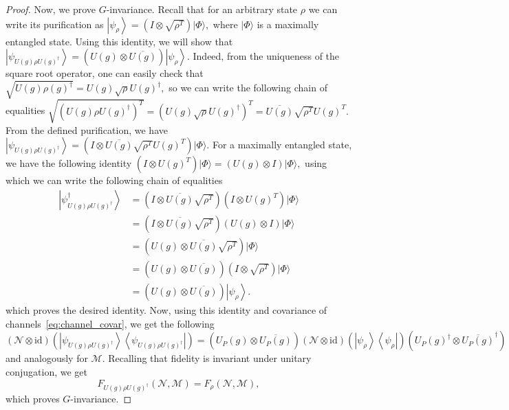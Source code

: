 \documentclass[11pt,letterpaper]{article}
\theoremstyle{plain}
\theoremstyle{plain}
\theoremstyle{plain}
\theoremstyle{plain}
\theoremstyle{plain}
\theoremstyle{plain}
\theoremstyle{plain}
\theoremstyle{definition}
\theoremstyle{plain}
\begin{document}
\begin{proof}
    Now, we prove $G$-invariance. Recall that for an arbitrary state $\rho$ we can write its purification as
    $
        \left|\psi_\rho\right\rangle=\left(I \otimes \sqrt{\rho^T}\right)|\Phi\rangle,
    $
    where $|\Phi\rangle$ is a maximally entangled state. Using this identity, we will show that
    $
        \left|\psi_{U(g) \rho U(g)^{\dagger}}\right\rangle=\left(U(g) \otimes \overline{U(g)}\right)\left|\psi_\rho\right\rangle.
    $
    Indeed, from the uniqueness of the square root operator, one can easily check that
    $
        \sqrt{U(g) \rho (g)^{\dagger}}=U(g) \sqrt{\rho} U(g)^{\dagger},
    $
    so we can write the following chain of equalities
    $
        \sqrt{\left(U(g) \rho U(g)^{\dagger}\right)^T}=\left(U(g) \sqrt{\rho} U(g)^{\dagger}\right)^T=\overline{U(g)} \sqrt{\rho^T} U(g)^T.
    $
    From the defined purification, we have
    $
        \left|\psi_{U(g) \rho U(g)^{\dagger}}\right\rangle=\left(I \otimes \overline{U(g)} \sqrt{\rho^T} U(g)^T\right)|\Phi\rangle.
    $
    For a maximally entangled state, we have the following identity
    $
        \left(I \otimes U(g)^T\right)|\Phi\rangle=\left(U(g) \otimes I\right)|\Phi\rangle,
    $
    using which we can write the following chain of equalities
    \[
        \begin{aligned}
        \left|\psi_{U(g) \rho U(g)^{\dagger}}^{\dagger}\right\rangle & =\left(I \otimes \overline{U(g)} \sqrt{\rho^T}\right)\left(I \otimes U(g)^T\right)|\Phi\rangle \\
        & =\left(I \otimes \overline{U(g)} \sqrt{\rho^T}\right)\left(U(g) \otimes I\right)|\Phi\rangle \\
        & =\left(U(g) \otimes \overline{U(g)} \sqrt{\rho^T}\right)|\Phi\rangle \\
        & =\left(U(g) \otimes \overline{U(g)}\right)\left(I \otimes \sqrt{\rho^T}\right)|\Phi\rangle \\
        & =\left(U(g) \otimes \overline{U(g)}\right)\left|\psi_\rho\right\rangle .
        \end{aligned}
    \]
    which proves the desired identity. Now, using this identity and covariance of channels~\eqref{eq:channel_covar}, we get the following
    \[
        (\mathcal{N} \otimes \mathrm{id})\left(\left|\psi_{U(g) \rho U(g)^{\dagger}}\right\rangle\left\langle\psi_{U(g) \rho U(g)^{\dagger}}\right|\right)=\left(U_P(g) \otimes \overline{U_P(g)}\right)(\mathcal{N} \otimes \mathrm{id})\left(\left|\psi_\rho\right\rangle\left\langle\psi_\rho\right|\right)\left(U_P(g)^{\dagger} \otimes \overline{U_P(g)}^{\dagger}\right)
    \]
    and analogously for $\mathcal{M}$. Recalling that fidelity is invariant under unitary conjugation, we get
    \[
        F_{U(g) \rho U(g)^{\dagger}}(\mathcal{N}, \mathcal{M})=F_\rho(\mathcal{N}, \mathcal{M}),
    \]
    which proves $G$-invariance. 


\end{proof}
\end{document}
